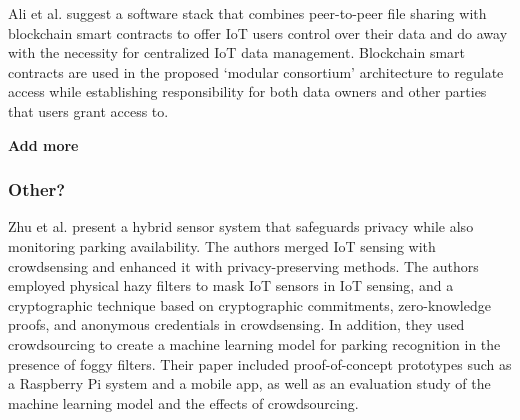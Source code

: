 \documentclass[conference]{IEEEtran}
\begin{document}

Ali et al. \cite{AliIoT} suggest a software stack that combines peer-to-peer file sharing
with blockchain smart contracts to offer IoT users control over their data
and do away with the necessity for centralized IoT data management. Blockchain
smart contracts are used in the proposed `modular consortium' architecture
to regulate access while establishing responsibility for both data owners
and other parties that users grant access to.

\textbf{\color{red}Add more}





\subsubsection{Other?}


Zhu et al. \cite{ZhuIntegrating} present a hybrid sensor system that safeguards
privacy while also monitoring parking availability. The authors merged IoT
sensing with crowdsensing and enhanced it with privacy-preserving methods.
The authors employed physical hazy filters to mask IoT sensors in IoT sensing,
and a cryptographic technique based on cryptographic commitments, zero-knowledge
proofs, and anonymous credentials in crowdsensing. In addition, they used
crowdsourcing to create a machine learning model for parking recognition in
the presence of foggy filters. Their paper included proof-of-concept prototypes
such as a Raspberry Pi system and a mobile app, as well as an evaluation study
of the machine learning model and the effects of crowdsourcing.

\end{document}
